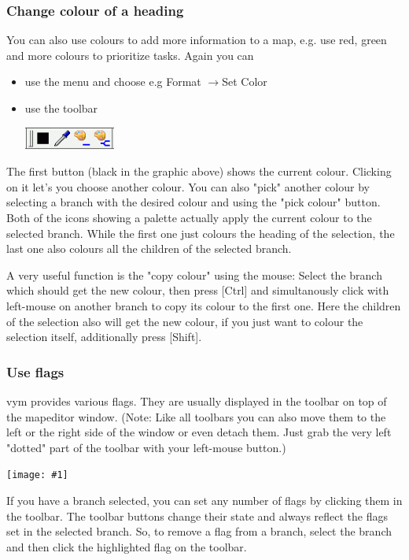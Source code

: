 \documentclass[12pt,a4paper]{article}
\newcommand{\maximage}[1]{  
    \begin{center}
        \texttt{[image: \#1]} 
    \end{center}
}
\newcommand{\vym}{{\sc vym }}
\newcommand{\ra}{$\longrightarrow$}
\newcommand{\key}[1]{[#1]}
\begin{document}
\subsubsection*{Change colour of a heading}
You can also use colours to add more information to a map, e.g. use
red, green and more colours to prioritize tasks. Again you can
\begin{itemize}
    \item use the menu and choose e.g Format \ra Set Color
    \item use the toolbar
        \begin{center}
            \includegraphics[width=3cm]{images/color-buttons.png}
        \end{center}    
\end{itemize}
The first button (black in the graphic above) shows the current colour.
Clicking on it let's you choose another colour. You can also "pick"
another colour by selecting a branch with the desired colour and using
the "pick colour" button. Both of the icons showing a palette actually
apply the current colour to the selected branch. While the first one
just colours the heading of the selection, the last one also colours all
the children of the selected branch.

A very useful function is the "copy colour" using the mouse: Select the
branch which should get the new colour, then press \key{Ctrl} and
simultanously click with left-mouse on another branch to copy its colour
to the first one. Here the children of the selection also will get the
new colour, if you just want to colour the selection itself,
additionally press \key{Shift}.

\subsubsection*{Use flags}
\vym provides various flags. They are usually displayed in the toolbar
on top of the mapeditor window. (Note: Like all toolbars you can also
move them to the left or the right side of the window or even detach
them. Just grab the very left "dotted" part of the toolbar with your
left-mouse button.) 
\maximage{images/default-flags.png} 
If you have a branch selected, you can set any number of flags by
clicking them in the toolbar. The toolbar buttons change their state and
always reflect the flags set in the selected branch. So, to remove a
flag from a branch, select the branch and then click the highlighted
flag on the toolbar.
\end{document}
